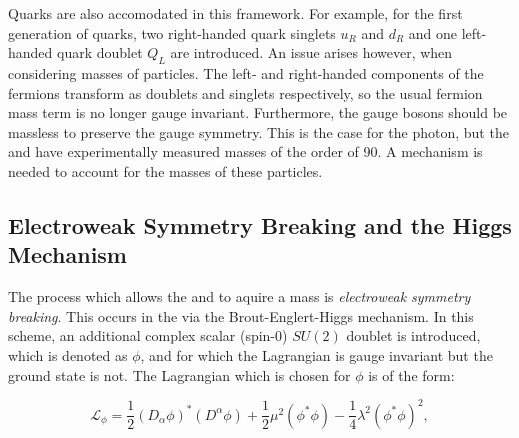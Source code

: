  Quarks are also accomodated in this framework. For example, for the first generation of quarks, two right-handed quark singlets $u_{R}$ and $d_{R}$ and one left-handed quark doublet $Q_{L}$ are introduced. An issue arises however, when considering masses of particles. 
The left- and right-handed components of the fermions transform as doublets and singlets respectively, so the usual fermion mass term is no longer gauge invariant.
Furthermore, the gauge bosons should be massless to preserve the gauge symmetry. This is the case for the photon, but the \PWpm and \PZzero have experimentally measured masses of the order of 90\GeV. A mechanism is needed to account for the masses of these particles. 

\subsection{Electroweak Symmetry Breaking and the Higgs Mechanism}
\label{sec:th:ewsb}

The process which allows the \PWpm and \PZzero to aquire a mass is \emph{electroweak symmetry breaking}. This occurs in the \SM via the Brout-Englert-Higgs mechanism. In this scheme, an additional complex scalar (spin-0) $SU(2)$ doublet is introduced, which is denoted as $\phi$, and for which the Lagrangian is gauge invariant but the ground state is not. 
The Lagrangian which is chosen for $\phi$ is of the form:

\begin{equation}
\label{eq:th:higgs_lagrangian}
\mathcal{L}_{\phi} = \frac{1}{2}(D_{\alpha} \phi)^{*} (D^{\alpha} \phi) + \frac{1}{2} \mu^{2} (\phi^{*} \phi) - \frac{1}{4} \lambda^{2} (\phi^{*} \phi) ^{2} ,
\end{equation}

